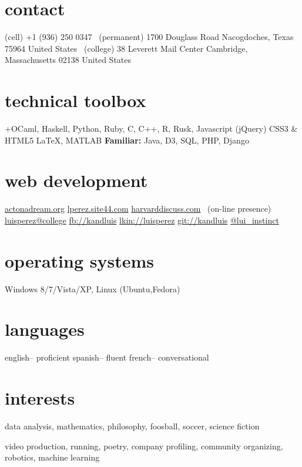 \documentclass[]{friggeri-cv} %
\begin{document}


\begin{aside} %
\section{contact}
(cell)
+1 (936) 250 0347
~(permanent)
1700 Douglass Road
Nacogdoches, Texas 75964
United States
~(college)
38 Leverett Mail Center
Cambridge, Massachusetts 02138
United States
\section{technical toolbox}
+OCaml, Haskell,
Python, Ruby,
C, C++, R, Rusk,
Javascript (jQuery)
CSS3 \& HTML5
\LaTeX, MATLAB
\textbf{Familiar:} Java, D3, SQL, PHP, Django
\section{web development}
\href{http://www.actonadream.org/}{actonadream.org}
\href{http://lperez.site44.com}{lperez.site44.com}
\href{https://www.hcs.harvard.edu/~harvarddiscuss/index.php/en/}{harvarddiscuss.com}
~(on-line presence)
\href{mailto:luisperez@college.harvard.edu}{luisperez@college}
\href{http://facebook.com/kandluis}{fb://kandluis}
\href{http://www.linkedin.com/pub/luis-perez/73/793/770}{lkin://luisperez}
\href{http://www.github.com/kandluis}{git://kandluis}
\href{http://www.twitter.com/lui\_instinct}{@lui\_instinct}
\section{operating systems}
Windows 8/7/Vista/XP, Linux (Ubuntu,Fedora)
\section{languages}
english-- proficient
spanish-- fluent
french-- conversational
\section{interests}
data analysis, mathematics, philosophy, foosball, soccer, science fiction
\begin{detailed}
video production, running, poetry, company profiling,  community organizing, robotics, machine learning
\end{detailed}
\end{aside}
\end{document}
